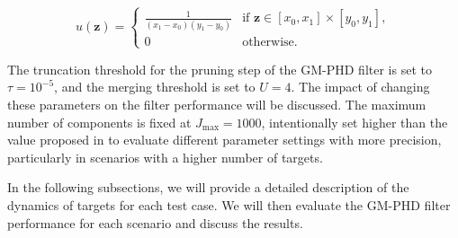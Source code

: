 \begin{equation}
    u(\mathbf{z}) = \begin{cases}
        \frac{1}{(x_1 - x_0)(y_1 - y_0)} & \text{if } \mathbf{z} \in [x_0, x_1] \times [y_0, y_1], \\
        0 & \text{otherwise}.
    \end{cases}
\end{equation}

The truncation threshold for the pruning step of the GM-PHD filter is set to $\tau = 10^{-5}$, and the merging threshold is set to $U = 4$. The impact of changing these parameters on the filter performance will be discussed. The maximum number of components is fixed at $J_{\mathrm{max}} = 1000$, intentionally set higher than the value proposed in \cite{voGaussianMixtureProbability2006} to evaluate different parameter settings with more precision, particularly in scenarios with a higher number of targets.

In the following subsections, we will provide a detailed description of the dynamics of targets for each test case. We will then evaluate the GM-PHD filter performance for each scenario and discuss the results.
